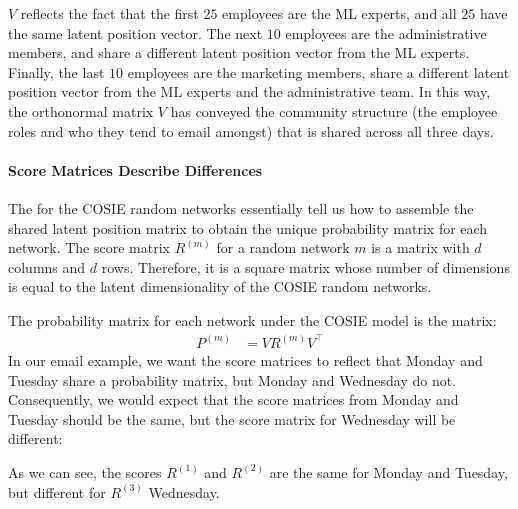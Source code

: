 \documentclass[letterpaper,10pt,english]{jupyterBook}
\begin{document}
\noindent{}

\sphinxAtStartPar
\(V\) reflects the fact that the first \(25\) employees are the ML experts, and all \(25\) have the same latent position vector. The next \(10\) employees are the administrative members, and share a different latent position vector from the ML experts. Finally, the last \(10\) employees are the marketing members, share a different latent position vector from the ML experts and the administrative team. In this way, the orthonormal matrix \(V\) has conveyed the community structure (the employee roles and who they tend to email amongst) that is shared across all three days.


\paragraph{Score Matrices Describe Differences}
\label{\detokenize{representations/ch5/multi-network-models:score-matrices-describe-differences}}
\sphinxAtStartPar
The  for the COSIE random networks essentially tell us how to assemble the shared latent position matrix to obtain the unique probability matrix for each network. The score matrix \(R^{(m)}\) for a random network \(m\) is a matrix with \(d\) columns and \(d\) rows. Therefore, it is a square matrix whose number of dimensions is equal to the latent dimensionality of the COSIE random networks.

\sphinxAtStartPar
The probability matrix for each network under the COSIE model is the matrix:
\begin{align*}
    P^{(m)} &= VR^{(m)}V^\top
\end{align*}
\sphinxAtStartPar
In our email example, we want the score matrices to reflect that Monday and Tuesday share a probability matrix, but Monday and Wednesday do not. Consequently, we would expect that the score matrices from Monday and Tuesday should be the same, but the score matrix for Wednesday will be different:

\noindent{}

\sphinxAtStartPar
As we can see, the scores \(R^{(1)}\) and \(R^{(2)}\) are the same for Monday and Tuesday, but different for \(R^{(3)}\) Wednesday.
\end{document}
